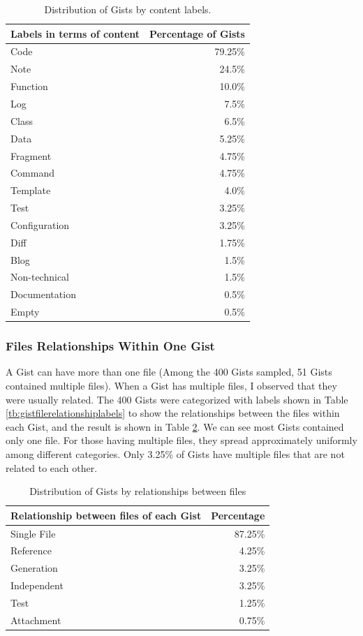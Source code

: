 \begin{table}[!htb]
 \begin{center}
 \begin{tabular}{@{}lr} \hline
    \textbf{Labels in terms of content}	&	\textbf{Percentage of Gists} \\ \hline
	Code & 79.25\%\\
	Note & 24.5\%\\
	Function & 10.0\%\\
	Log & 7.5\%\\
	Class & 6.5\%\\
	Data & 5.25\%\\
	Fragment & 4.75\%\\
	Command & 4.75\%\\
	Template & 4.0\%\\
	Test & 3.25\%\\
	Configuration & 3.25\%\\
	Diff & 1.75\%\\
	Blog & 1.5\%\\
	Non-technical & 1.5\%\\
	Documentation & 0.5\%\\
	Empty & 0.5\%\\ \hline
 \end{tabular}
 \end{center}
 \caption{Distribution of Gists by content labels.}
 \label{tb:labels}
\end{table}

\subsubsection{Files Relationships Within One Gist}
A Gist can have more than one file (Among the 400 Gists sampled, 51 Gists contained multiple files). When a Gist has multiple files, I observed that they were usually related. The 400 Gists were categorized with labels shown in Table \ref{tb:gistfilerelationshiplabels} to show the relationships between the files within each Gist, and the result is shown in Table \ref{tb:relationship}. We can see most Gists contained only one file. For those having multiple files, they spread approximately uniformly among different categories. Only 3.25\% of Gists have multiple files that are not related to each other. 

\begin{table}[!htb]
 \begin{center}
 \begin{tabular}{lr}
    \textbf{Relationship between files of each Gist}	&	\textbf{Percentage} \\ \hline
	Single File & 87.25\%\\
	Reference & 4.25\%\\
	Generation & 3.25\%\\
	Independent & 3.25\%\\
	Test & 1.25\%\\
	Attachment & 0.75\%\\ \hline
 \end{tabular}
 \end{center}
 \caption{Distribution of Gists by relationships between files}
 \label{tb:relationship}
\end{table}
